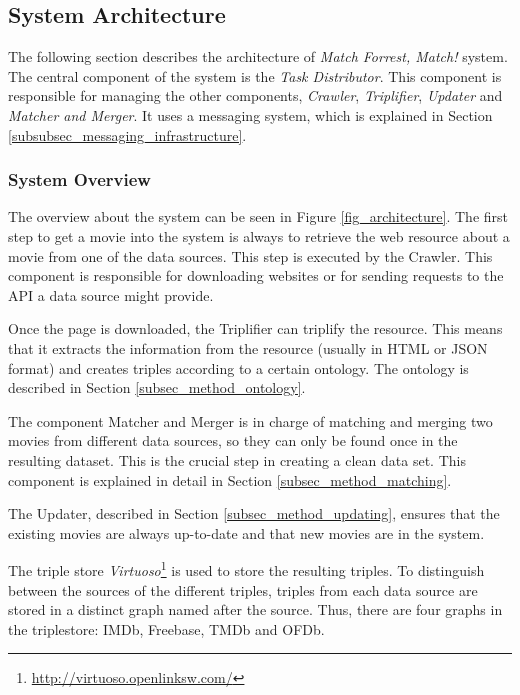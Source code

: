 \subsection{System Architecture}
\label{subsec_method_architecture}

The following section describes the architecture of \emph{Match Forrest, Match!} system.
The central component of the system is the \textit{Task Distributor}.
This component is responsible for managing the other components, \textit{Crawler}, \textit{Triplifier}, \textit{Updater} and \textit{Matcher and Merger}.
It uses a messaging system, which is explained in Section \ref{subsubsec_messaging_infrastructure}.

\subsubsection{System Overview}
\label{subsubsec_workflow}

The overview about the system can be seen in Figure \ref{fig_architecture}.
The first step to get a movie into the system is always to retrieve the web resource about a movie from one of the data sources.
This step is executed by the Crawler.
This component is responsible for downloading websites or for sending requests to the API a data source might provide.

Once the page is downloaded, the Triplifier can triplify the resource.
This means that it extracts the information from the resource (usually in HTML or JSON format) and creates triples according to a certain ontology.
The ontology is described in Section \ref{subsec_method_ontology}.

The component Matcher and Merger is in charge of matching and merging two movies from different data sources, so they can only be found once in the resulting dataset.
This is the crucial step in creating a clean data set.
This component is explained in detail in Section \ref{subsec_method_matching}.

The Updater, described in Section \ref{subsec_method_updating}, ensures that the existing movies are always up-to-date and that new movies are in the system.

The triple store \emph{Virtuoso}\footnote{\url{http://virtuoso.openlinksw.com/}} is used to store the resulting triples.
To distinguish between the sources of the different triples, triples from each data source are stored in a distinct graph named after the source.
Thus, there are four graphs in the triplestore: IMDb, Freebase, TMDb and OFDb.

